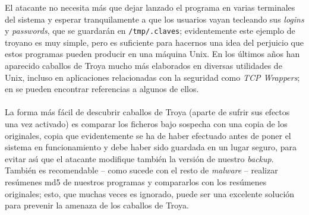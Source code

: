 El atacante no necesita m\'as que dejar lanzado el programa en varias terminales
del sistema y esperar tranquilamente a que los usuarios vayan tecleando sus
{\it logins} y {\it passwords}, que se guardar\'an en {\tt /tmp/.claves};
evidentemente este ejemplo de troyano es muy simple, pero es suficiente para
hacernos una idea del perjuicio que estos programas pueden producir en una
m\'aquina Unix. En los \'ultimos a\~nos han aparecido caballos de Troya mucho
m\'as elaborados en diversas utilidades de Unix, incluso en aplicaciones 
relacionadas con la seguridad como {\it TCP Wrappers}; en \cite{kn:cert99} se
pueden encontrar referencias a algunos de ellos.\\
\\La forma m\'as f\'acil de descubrir caballos de Troya (aparte de sufrir sus
efectos una vez activado) es comparar los ficheros bajo sospecha con una copia
de los originales, copia que evidentemente se ha de haber efectuado antes de
poner el sistema en funcionamiento y debe haber sido guardada en un lugar 
seguro, para evitar as\'{\i} que el atacante modifique tambi\'en la versi\'on 
de nuestro {\it backup}. Tambi\'en es recomendable -- como sucede con el resto
de {\it malware} -- realizar res\'umenes {\sc md5} de nuestros programas y
compararlos con los res\'umenes originales; esto, que muchas veces es ignorado,
puede ser una excelente soluci\'on para prevenir la amenaza de los caballos de
Troya.
